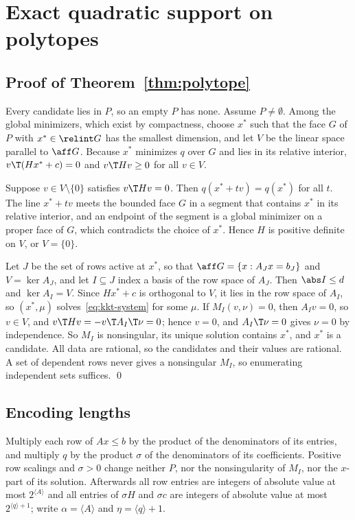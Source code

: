 \section{Exact quadratic support on polytopes}\label{app:polytope}

\subsection{Proof of Theorem~\ref{thm:polytope}}

Every candidate lies in $P$, so an empty $P$ has none. Assume $P\ne\emptyset$.
Among the global minimizers, which exist by compactness, choose $x^\ast$ such
that the face $G$ of $P$ with $x^\ast\in\relint G$ has the smallest dimension,
and let $V$ be the linear space parallel to $\aff G$. Because $x^\ast$
minimizes $q$ over $G$ and lies in its relative interior,
$v\T(Hx^\ast+c)=0$ and $v\T Hv\ge0$ for all $v\in V$.

Suppose $v\in V\setminus\{0\}$ satisfies $v\T Hv=0$. Then $q(x^\ast+tv)=q(x^\ast)$
for all $t$. The line $x^\ast+tv$ meets the bounded face $G$ in a segment that
contains $x^\ast$ in its relative interior, and an endpoint of the segment is
a global minimizer on a proper face of $G$, which contradicts the choice of
$x^\ast$. Hence $H$ is positive definite on $V$, or $V=\{0\}$.

Let $J$ be the set of rows active at $x^\ast$, so that
$\aff G=\{x:A_Jx=b_J\}$ and $V=\ker A_J$, and let $I\subseteq J$ index a basis
of the row space of $A_J$. Then $\abs I\le d$ and $\ker A_I=V$. Since
$Hx^\ast+c$ is orthogonal to $V$, it lies in the row space of $A_I$, so
$(x^\ast,\mu)$ solves~\eqref{eq:kkt-system} for some $\mu$. If $M_I(v,\nu)=0$,
then $A_Iv=0$, so $v\in V$, and $v\T Hv=-v\T A_I\T\nu=0$; hence $v=0$, and
$A_I\T\nu=0$ gives $\nu=0$ by independence. So $M_I$ is nonsingular, its unique
solution contains $x^\ast$, and $x^\ast$ is a candidate. All data are rational,
so the candidates and their values are rational. A set of dependent rows
never gives a nonsingular $M_I$, so enumerating independent sets suffices.
\qed

\subsection{Encoding lengths}

Multiply each row of $Ax\le b$ by the product of the denominators of its
entries, and multiply $q$ by the product $\sigma$ of the denominators of its
coefficients. Positive row scalings and $\sigma>0$ change neither $P$, nor the
nonsingularity of $M_I$, nor the $x$-part of its solution. Afterwards all row
entries are integers of absolute value at most $2^{\langle A\rangle}$ and all
entries of $\sigma H$ and $\sigma c$ are integers of absolute value at most
$2^{\langle q\rangle+1}$; write $\alpha=\langle A\rangle$ and
$\eta=\langle q\rangle+1$.

